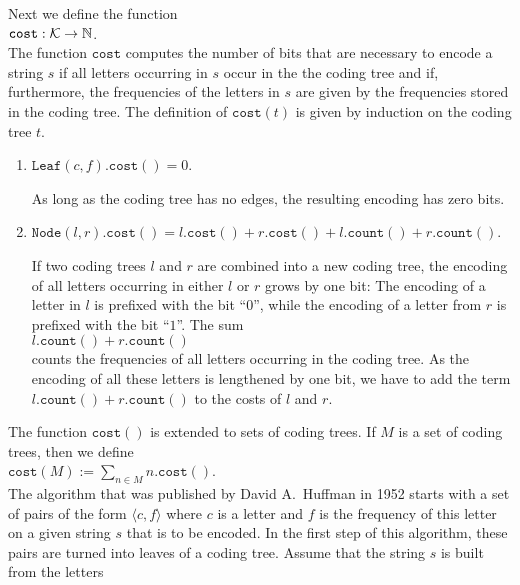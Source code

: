 Next we define the function
\\[0.2cm]
\hspace*{1.3cm}
$\mathtt{cost}: \mathcal{K} \rightarrow {\mathbb N}$.
\\[0.2cm]
The function $\mathtt{cost}$ computes the number of bits that are necessary to encode a string $s$ if 
all letters occurring in $s$ occur in the the coding tree and if, furthermore, the frequencies of the letters
in $s$ are given by the frequencies stored in the coding tree.
The definition of $\mathtt{cost}(t)$ is given by induction on the coding tree $t$.
\begin{enumerate}
\item $\mathtt{Leaf}(c,f).\mathtt{cost}() = 0$.

      As long as the coding tree has no edges, the resulting encoding has zero bits.
\item $\mathtt{Node}(l,r).\mathtt{cost}() = 
       l.\mathtt{cost}() + r.\mathtt{cost}() + l.\mathtt{count}() + r.\mathtt{count}()$.

      If two coding trees $l$ and $r$ are combined into a new coding tree, the encoding of all letters
      occurring in either $l$ or $r$ grows by one bit:  The encoding of a letter in $l$ is prefixed with the
      bit ``$0$'', while the encoding of a letter from $r$ is prefixed with the bit ``$1$''.  The sum
      \\[0.2cm]
      \hspace*{1.3cm}
      $l.\mathtt{count}() + r.\mathtt{count}()$
      \\[0.2cm] 
      counts the frequencies of all letters occurring in the coding tree.
      As the encoding of all these letters is lengthened by one bit,
      we have to add the term $l.\mathtt{count}() + r.\mathtt{count}()$ to the costs of $l$ and $r$.
\end{enumerate}
The function  $\mathtt{cost}()$ is extended to sets of coding trees.  If $M$ is a set of coding trees, then we
define
\\[0.2cm]
\hspace*{1.3cm}
$\mathtt{cost}(M) := \sum\limits_{n\in M} n.\mathtt{cost}()$. 
\\[0.2cm]
The algorithm that was published by David A.~Huffman in 1952 \cite{huffman:52} starts with a set of pairs of
the form $\langle c, f\rangle$ where $c$ is a letter and $f$ is the frequency of this letter on a given string
$s$ that is to be encoded.  In the first step of this algorithm, these pairs are turned into leaves of a coding tree.
Assume that the string $s$ is built from the  letters
